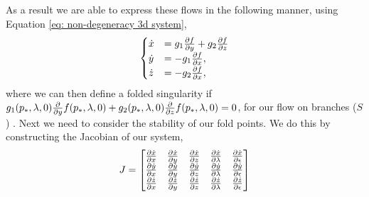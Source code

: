 As a result we are able to express these flows in the following manner, using Equation \ref{eq: non-degeneracy 3d system}, 
\begin{equation}
\begin{cases}
\dot{x}&=g_1\pd{f}{y}+g_2\pd{f}{z}\\
\dot{y}&=-g_1\pd{f}{x},\\
\dot{z}&=-g_2\pd{f}{x},
\end{cases}
\end{equation}
where we can then define a folded singularity if $ g_1(p_*,\lambda,0)\pd{}{y}f(p_*,\lambda,0)+g_2(p_*,\lambda,0)\pd{}{z}f(p_*,\lambda,0)=0 $, for our flow on branches ($ S $) \citep{MMO}. Next we need to consider the stability of our fold points. We do this by constructing the Jacobian of our system, 
\begin{equation}
J=\begin{bmatrix}
\pd{\dot{x}}{x}&\pd{\dot{x}}{y}&\pd{\dot{x}}{z}&\pd{\dot{x}}{\lambda}&\pd{\dot{x}}{\epsilon}\\
\pd{\dot{y}}{x}&\pd{\dot{y}}{y}&\pd{\dot{y}}{z}&\pd{\dot{y}}{\lambda}&\pd{\dot{y}}{\epsilon}\\
\pd{\dot{z}}{x}&\pd{\dot{z}}{y}&\pd{\dot{z}}{z}&\pd{\dot{z}}{\lambda}&\pd{\dot{z}}{\epsilon}\\
\end{bmatrix}
\end{equation}
